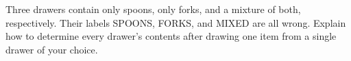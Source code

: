 Three drawers contain only spoons, only forks, and a mixture of both, respectively. Their labels SPOONS, FORKS, and MIXED are all wrong. Explain how to determine every drawer's contents after drawing one item from a single drawer of your choice.
